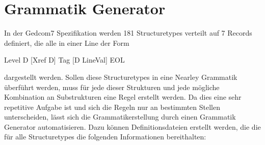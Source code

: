 \section{Grammatik Generator}
\label{sec: Konzept - Grammatik Generator}
In der Gedcom7 Spezifikation werden 181 Structuretypes verteilt auf 7 Records definiert, die alle in einer Line der Form
\begin{center}
	Level  D  [Xref  D]  Tag  [D  LineVal]  EOL
\end{center}
dargestellt werden. Sollen diese Structuretypes in eine Nearley Grammatik überführt werden, muss für jede dieser Strukturen und jede mögliche Kombination an Substrukturen eine Regel erstellt werden. Da dies eine sehr repetitive Aufgabe ist und sich die Regeln nur an bestimmten Stellen unterscheiden, lässt sich die Grammatikerstellung durch einen Grammatik Generator automatisieren. Dazu können Definitionsdateien erstellt werden, die die für alle Structuretypes die folgenden Informationen bereithalten: 
